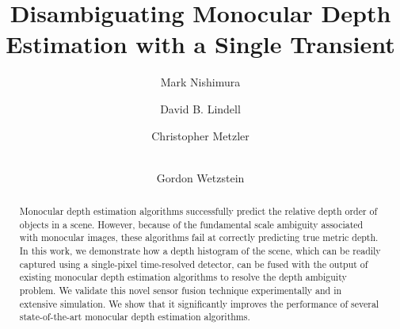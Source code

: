 \documentclass[runningheads]{llncs}
\begin{document}
\pagestyle{headings}
\mainmatter
\def\ECCVSubNumber{3668}  %

\title{Disambiguating Monocular Depth Estimation with a Single Transient} %

%
\author{Mark Nishimura  \and
David B. Lindell \and
Christopher Metzler \and \\
Gordon Wetzstein}
%
%
\maketitle

\begin{abstract}
  Monocular depth estimation algorithms successfully predict the
  relative depth order of objects in a scene.
  However, because of the fundamental scale ambiguity associated with monocular
  images, these algorithms fail at correctly predicting true metric
  depth. In this work, we demonstrate how a depth histogram of the scene, which
  can be readily captured using a single-pixel time-resolved
    detector, can be fused with the output of existing monocular depth
  estimation algorithms to resolve the depth ambiguity problem.
  We validate this novel sensor fusion technique experimentally and in extensive
  simulation. We show that it significantly improves the performance of several
  state-of-the-art monocular depth estimation algorithms.  
\end{abstract}
\end{document}
